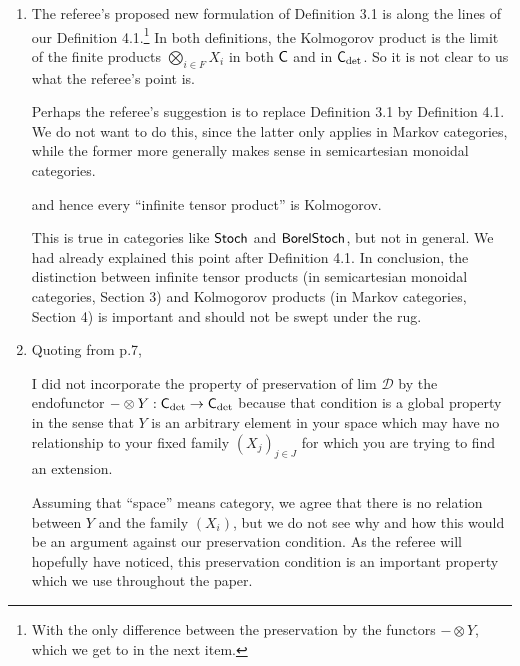 \documentclass[11pt]{article}
\begin{document}
\begin{enumerate}[resume,label=(\alph*).]
	\item The referee's proposed new formulation of Definition 3.1 is along the lines of our Definition 4.1.\footnote{With the only difference between the preservation by the functors $-\otimes Y$, which we get to in the next item.} In both definitions, the Kolmogorov product is the limit of the finite products $\bigotimes_{i \in F} X_i$ in both $\mathsf{C}$ and in $\mathsf{C}_{\det}$. So it is not clear to us what the referee's point is. 

		Perhaps the referee's suggestion is to replace Definition 3.1 by Definition 4.1. We do not want to do this, since the latter only applies in Markov categories, while the former more generally makes sense in semicartesian monoidal categories.
		\begin{displayquote}
			and hence every ``infinite tensor product'' is Kolmogorov.
		\end{displayquote}
		This is true in categories like $\operatorname{\mathsf{Stoch}}$ and $\operatorname{\mathsf{BorelStoch}}$, but not in general. We had already explained this point after Definition 4.1. In conclusion, the distinction between infinite tensor products (in semicartesian monoidal categories, Section 3) and Kolmogorov products (in Markov categories, Section 4) is important and should not be swept under the rug.
	\item Quoting from p.7,
		\begin{displayquote}
			I did not incorporate the property of preservation of lim $\mathcal{D}$ by the endofunctor
			$-\otimes Y : \mathsf{C}_{\det} \to \mathsf{C}_{\det}$ because that condition is a global property in the sense
		that $Y$ is an arbitrary element in your space which may have no relationship
		to your fixed family $(X_j)_{j\in J}$ for which you are trying to find an extension.
		\end{displayquote}
		Assuming that ``space'' means category, we agree that there is no relation between $Y$ and the family $(X_i)$, but we do not see why and how this would be an argument against our preservation condition. As the referee will hopefully have noticed, this preservation condition is an important property which we use throughout the paper.


\end{enumerate}
\end{document}
